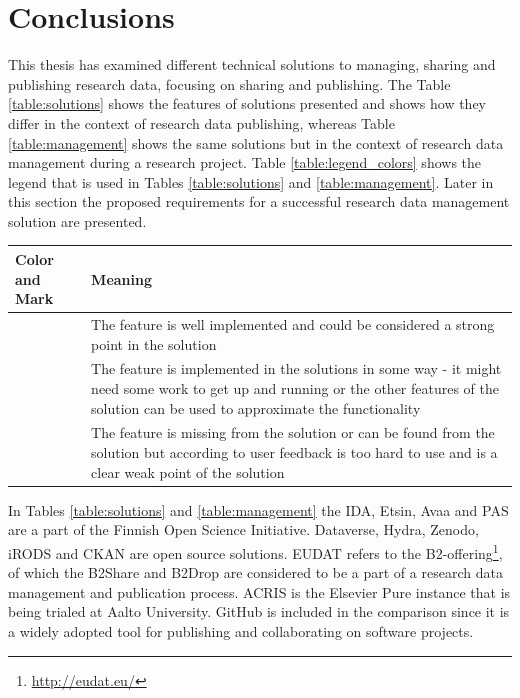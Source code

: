 \chapter{Conclusions}
\label{chapter:conclusions}

This thesis has examined different technical solutions to managing, sharing and
publishing research data, focusing on sharing and publishing. The Table
\ref{table:solutions} shows the features of solutions presented and shows
how they differ in the context of research data publishing, whereas Table
\ref{table:management} shows the same solutions but in the context of research
data management during a research project. Table
\ref{table:legend_colors} shows the legend that is used in Tables
\ref{table:solutions} and \ref{table:management}. Later in this section the
proposed requirements for a successful research data management solution
are presented.

\label{table:legend_colors}
    \begin{tabularx}{\textwidth}{| >{\raggedright}p{3cm} | X |}
    \hline
    \textbf{Color and Mark} & \textbf{Meaning} \\
    \hline
    \multicolumn{1}{|c|}{\cellcolor{green}++} & The feature is well implemented and could be considered a strong point
                          in the solution \\
    \hline
    \multicolumn{1}{|c|}{\cellcolor{yellow}+} & The feature is implemented in the solutions in some way - it might need
                          some work to get up and running or the other features of the solution can be used to
                          approximate the functionality \\
    \hline
    \multicolumn{1}{|c|}{\cellcolor{red}-}    & The feature is missing from the solution or can be found from the solution but according
                          to user feedback is too hard to use and is a clear weak point of the solution \\
    \hline
\end{tabularx}

In Tables \ref{table:solutions} and \ref{table:management} the IDA, Etsin, Avaa and PAS are a part of the
Finnish Open Science Initiative. Dataverse, Hydra, Zenodo, iRODS and CKAN are
open source solutions. EUDAT refers to the B2-offering\footnote{\url{http://eudat.eu/}},
of which the B2Share and B2Drop are considered to be a part of a research
data management and publication process. ACRIS is the Elsevier Pure instance
that is being trialed at Aalto University. GitHub is included in the
comparison since it is a widely adopted tool for publishing and collaborating
on software projects.

